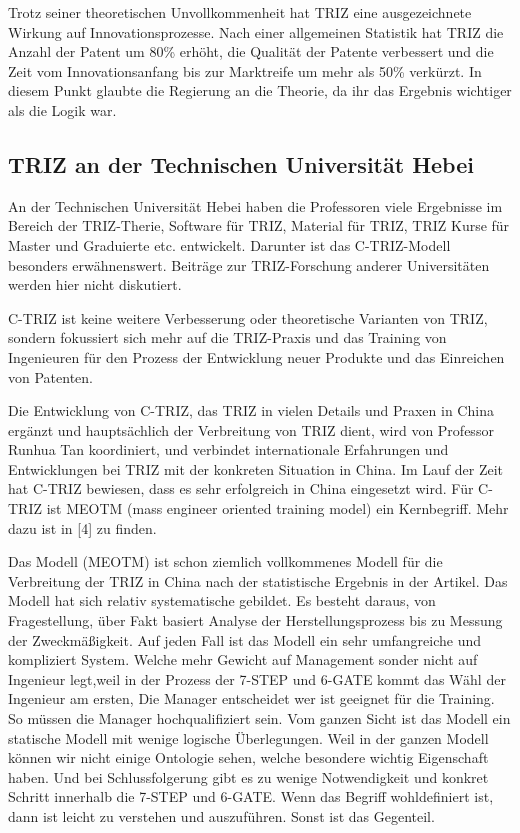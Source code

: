 \documentclass[11pt,a4paper]{article}
\begin{document}
Trotz seiner theoretischen Unvollkommenheit hat TRIZ eine ausgezeichnete
Wirkung auf Innovationsprozesse. Nach einer allgemeinen Statistik hat TRIZ die
Anzahl der Patent um 80\% erhöht, die Qualität der Patente verbessert und die
Zeit vom Innovationsanfang bis zur Marktreife um mehr als 50\% verkürzt. In
diesem Punkt glaubte die Regierung an die Theorie, da ihr das Ergebnis
wichtiger als die Logik war.

\subsection{TRIZ an der Technischen Universität Hebei}

An der Technischen Universität Hebei haben die Professoren viele Ergebnisse im
Bereich der TRIZ-Therie, Software für TRIZ, Material für TRIZ, TRIZ Kurse für
Master und Graduierte etc. entwickelt. Darunter ist das C-TRIZ-Modell
besonders erwähnenswert. Beiträge zur TRIZ-Forschung anderer Universitäten
werden hier nicht diskutiert.

C-TRIZ ist keine weitere Verbesserung oder theoretische Varianten von TRIZ,
sondern fokussiert sich mehr auf die TRIZ-Praxis und das Training von
Ingenieuren für den Prozess der Entwicklung neuer Produkte und das Einreichen
von Patenten.

Die Entwicklung von C-TRIZ, das TRIZ in vielen Details und Praxen in China
ergänzt und hauptsächlich der Verbreitung von TRIZ dient, wird von Professor
Runhua Tan koordiniert, und verbindet internationale Erfahrungen und
Entwicklungen bei TRIZ mit der konkreten Situation in China. Im Lauf der Zeit
hat C-TRIZ bewiesen, dass es sehr erfolgreich in China eingesetzt wird. Für
C-TRIZ ist MEOTM (mass engineer oriented training model) ein Kernbegriff.
Mehr dazu ist in [4] zu finden.

Das Modell (MEOTM) ist schon ziemlich vollkommenes Modell für die Verbreitung
der TRIZ in China nach der statistische Ergebnis in der Artikel. Das Modell
hat sich relativ systematische gebildet. Es besteht daraus, von Fragestellung,
über Fakt basiert Analyse der Herstellungsprozess bis zu Messung der
Zweckmäßigkeit. Auf jeden Fall ist das Modell ein sehr umfangreiche und
kompliziert System. Welche mehr Gewicht auf Management sonder nicht auf
Ingenieur legt,weil in der Prozess der 7-STEP und 6-GATE kommt das Wähl der
Ingenieur am ersten, Die Manager entscheidet wer ist geeignet für die
Training. So müssen die Manager hochqualifiziert sein. Vom ganzen Sicht ist
das Modell ein statische Modell mit wenige logische Überlegungen. Weil in der
ganzen Modell können wir nicht einige Ontologie sehen, welche besondere
wichtig Eigenschaft haben. Und bei Schlussfolgerung gibt es zu wenige
Notwendigkeit und konkret Schritt innerhalb die 7-STEP und 6-GATE. Wenn das
Begriff wohldefiniert ist, dann ist leicht zu verstehen und
auszuführen. Sonst ist das Gegenteil.
\end{document}
